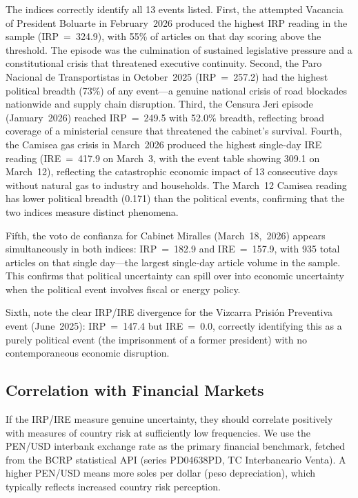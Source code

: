 \documentclass[12pt,a4paper]{article}
\begin{document}
The indices correctly identify all 13 events listed.  First, the attempted
Vacancia of President Boluarte in February~2026 produced the highest IRP
reading in the sample (IRP~=~324.9), with 55\% of articles on that day
scoring above the threshold.  The episode was the culmination of sustained
legislative pressure and a constitutional crisis that threatened executive
continuity.  Second, the Paro Nacional de Transportistas in October~2025
(IRP~=~257.2) had the highest political breadth (73\%) of any event---a
genuine national crisis of road blockades nationwide and supply chain
disruption.  Third, the Censura Jeri episode (January~2026) reached
IRP~=~249.5 with 52.0\% breadth, reflecting broad coverage of a ministerial
censure that threatened the cabinet's survival.  Fourth, the Camisea gas
crisis in March~2026 produced the highest single-day IRE reading (IRE~=~417.9
on March~3, with the event table showing 309.1 on March~12), reflecting the
catastrophic economic impact of 13 consecutive days without natural gas to
industry and households.  The March~12 Camisea reading has lower political
breadth (0.171) than the political events, confirming that the two indices
measure distinct phenomena.

Fifth, the voto de confianza for Cabinet Miralles (March~18,~2026) appears
simultaneously in both indices: IRP~=~182.9 and IRE~=~157.9, with 935 total
articles on that single day---the largest single-day article volume in the
sample.  This confirms that political uncertainty can spill over into
economic uncertainty when the political event involves fiscal or energy policy.

Sixth, note the clear IRP/IRE divergence for the Vizcarra Prisi\'on
Preventiva event (June~2025): IRP~=~147.4 but IRE~=~0.0, correctly
identifying this as a purely political event (the imprisonment of a former
president) with no contemporaneous economic disruption.

\subsection{Correlation with Financial Markets}
\label{subsec:fx}

If the IRP/IRE measure genuine uncertainty, they should correlate positively
with measures of country risk at sufficiently low frequencies.  We use the
PEN/USD interbank exchange rate as the primary financial benchmark, fetched
from the BCRP statistical API (series PD04638PD, TC Interbancario Venta).
A higher PEN/USD means more soles per dollar (peso depreciation), which
typically reflects increased country risk perception.
\end{document}
